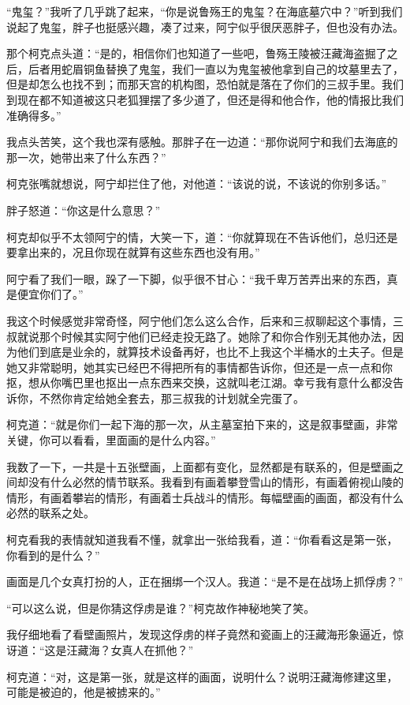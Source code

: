 “鬼玺？”我听了几乎跳了起来，“你是说鲁殇王的鬼玺？在海底墓穴中？”听到我们说起了鬼玺，胖子也挺感兴趣，凑了过来，阿宁似乎很厌恶胖子，但也没有办法。

那个柯克点头道：“是的，相信你们也知道了一些吧，鲁殇王陵被汪藏海盗掘了之后，后者用蛇眉铜鱼替换了鬼玺，我们一直以为鬼玺被他拿到自己的坟墓里去了，但是却怎么也找不到；而那天宫的机构图，恐怕就是落在了你们的三叔手里。我们到现在都不知道被这只老狐狸摆了多少道了，但还是得和他合作，他的情报比我们准确得多。”

我点头苦笑，这个我也深有感触。那胖子在一边道：“那你说阿宁和我们去海底的那一次，她带出来了什么东西？”

柯克张嘴就想说，阿宁却拦住了他，对他道：“该说的说，不该说的你别多话。”

胖子怒道：“你这是什么意思？”

柯克却似乎不太领阿宁的情，大笑一下，道：“你就算现在不告诉他们，总归还是要拿出来的，况且你现在就算有这些东西也没有用。”

阿宁看了我们一眼，跺了一下脚，似乎很不甘心：“我千卑万苦弄出来的东西，真是便宜你们了。”

我这个时候感觉非常奇怪，阿宁他们怎么这么合作，后来和三叔聊起这个事情，三叔就说那个时候其实阿宁他们已经走投无路了。她除了和你合作别无其他办法，因为他们到底是业余的，就算技术设备再好，也比不上我这个半桶水的土夫子。但是她又非常聪明，她其实已经巴不得把所有的事情都告诉你，但还是一点一点和你抠，想从你嘴巴里也抠出一点东西来交换，这就叫老江湖。幸亏我有意什么都没告诉你，不然你肯定给她全套去，那三叔我的计划就全完蛋了。

柯克道：“就是你们一起下海的那一次，从主墓室拍下来的，这是叙事壁画，非常关键，你可以看看，里面画的是什么内容。”

我数了一下，一共是十五张壁画，上面都有变化，显然都是有联系的，但是壁画之间却没有什么必然的情节联系。我看到有画着攀登雪山的情形，有画着俯视山陵的情形，有画着攀岩的情形，有画着士兵战斗的情形。每幅壁画的画面，都没有什么必然的联系之处。

柯克看我的表情就知道我看不懂，就拿出一张给我看，道：“你看看这是第一张，你看到的是什么？”

画面是几个女真打扮的人，正在捆绑一个汉人。我道：“是不是在战场上抓俘虏？”

“可以这么说，但是你猜这俘虏是谁？”柯克故作神秘地笑了笑。

我仔细地看了看壁画照片，发现这俘虏的样子竟然和瓷画上的汪藏海形象逼近，惊讶道：“这是汪藏海？女真人在抓他？”

柯克道：“对，这是第一张，就是这样的画面，说明什么？说明汪藏海修建这里，可能是被迫的，他是被掳来的。”

